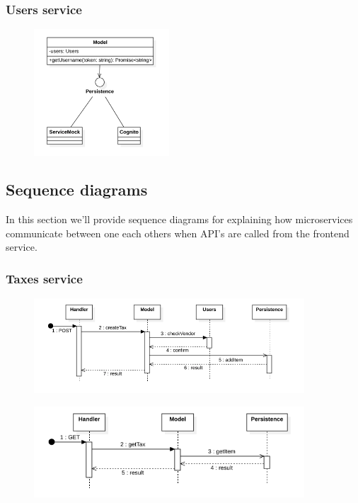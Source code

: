 \subsubsection{Users service}
\begin{figure}[H]
    \includegraphics[width=0.45\textwidth]{res/images/class-diagrams/users.png}
\end{figure}


\subsection{Sequence diagrams} \label{_sequenceDiagram}
In this section we'll provide sequence diagrams for explaining how microservices communicate between one each others when API's are called from the frontend service.

\subsubsection{Taxes service}
\begin{figure}[H]
    \includegraphics[width=0.9\textwidth]{res/images/sequence-diagrams/taxes/createTax.png}
\end{figure}

\begin{figure}[H]
    \includegraphics[width=0.9\textwidth]{res/images/sequence-diagrams/taxes/getTax.png}
\end{figure}


